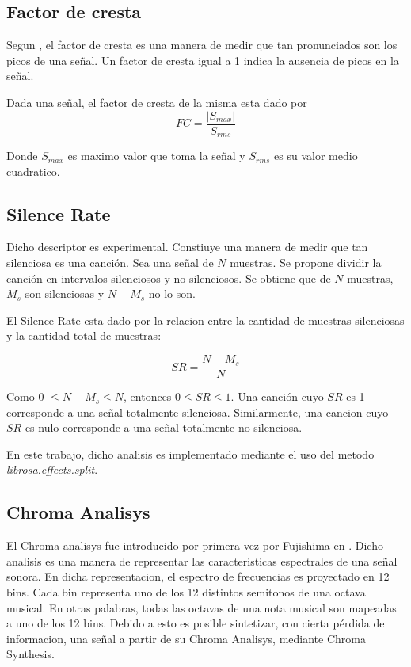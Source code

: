 \documentclass[]{article}
\begin{document}
\begin{multicols}{2}
\subsection{Factor de cresta}
Segun \cite{ wiki:crest}{}, el factor de cresta es una manera de medir que tan
pronunciados son los picos de una señal. Un factor de cresta igual a 1 indica
la ausencia de picos en la señal.

Dada una señal, el factor de cresta de la misma esta dado por
\begin{equation*}
  FC=\frac{\left|S_{max}\right|}{S_{rms}}
\end{equation*}

Donde $S_{max}$ es maximo valor que toma la señal y $S_{rms}$ es su valor medio
cuadratico.


\subsection{Silence Rate}
Dicho descriptor es experimental. Constiuye una manera de medir que tan
silenciosa es una canción. Sea una señal de $N$ muestras. Se propone dividir la
canción en intervalos silenciosos y no silenciosos. Se obtiene que de $N$ muestras,
$M_s$ son silenciosas y $N-M_s$ no lo son.

El Silence Rate esta dado por la relacion entre la cantidad de muestras
silenciosas y la cantidad total de muestras:

\begin{equation}
  SR=\frac{N-M_s}{N}
\end{equation}

Como  0 $\leq N-M_s\leq N$, entonces $0 \leq SR \leq 1$.
Una canción cuyo $SR$ es 1 corresponde a una señal totalmente silenciosa.
Similarmente, una cancion cuyo $SR$ es nulo corresponde a una señal totalmente
no silenciosa.

En este trabajo, dicho analisis es implementado mediante el uso del metodo
\emph{{librosa.effects.split}}.

\subsection{Chroma Analisys}
\label{Sec:Chroma}
El Chroma analisys fue introducido por primera vez por Fujishima en \cite{fujishima1999realtime}.
Dicho analisis es una manera de representar las caracteristicas espectrales
de una señal sonora. En dicha representacion, el espectro de frecuencias es
proyectado en 12 bins. Cada bin representa uno de los 12 distintos semitonos
de una octava musical. En otras palabras, todas las octavas de una nota musical
son mapeadas a uno de los 12 bins. Debido a esto es posible sintetizar, con cierta
pérdida de informacion, una señal a partir de su Chroma Analisys, mediante Chroma
Synthesis.


\end{multicols}
\end{document}
